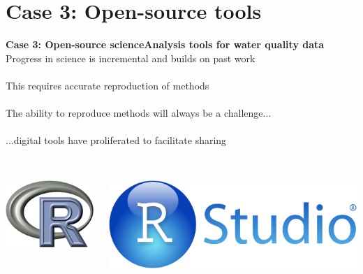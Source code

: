 \documentclass[serif]{beamer}\usepackage[]{graphicx}\usepackage[]{color}
\begin{document}
\section{Case 3: Open-source tools}
\begin{frame}{\textbf{Case 3: Open-source science}}{\textbf{Analysis tools for water quality data}}
\onslide<+->
Progress in science is incremental and builds on past work\\~\\
This requires accurate reproduction of methods\\~\\
The ability to reproduce methods will always be a challenge...\\~\\
\onslide<+->
...digital tools have proliferated to \alert{facilitate sharing}\\~\\
\begin{columns}
\begin{column}{0.25\textwidth}
\centerline{\includegraphics[width = \textwidth]{fig/Rlogo.png}}
\end{column}
\begin{column}{0.25\textwidth}
\centerline{\includegraphics[width = \textwidth]{fig/RStudio.png}}

\end{column}
\end{columns}
\end{frame}
\end{document}
